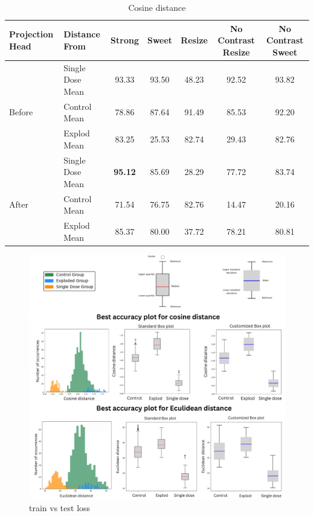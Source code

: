 \begin{table}[H]
  \centering
  \begin{tabular}{@{}llccccc@{}}
  \toprule
  Projection Head & Distance From      & Strong & Sweet & Resize & No Contrast Resize & No Contrast Sweet \\ \midrule
                  & Single Dose Mean   & 93.33      & 93.50     & 48.23      & 92.52                  & 93.82                 \\
  Before          & Control Mean       & 78.86      & 87.64     & 91.49      & 85.53                  & 92.20                 \\
                  & Explod Mean        & 83.25      & 25.53     & 82.74      & 29.43                  & 82.76                 \\ \midrule
                  & Single Dose Mean   & \textbf{95.12}      & 85.69     & 28.29      & 77.72                  & 83.74                 \\
  After           & Control Mean       & 71.54      & 76.75     & 82.76      & 14.47                  & 20.16                 \\
                  & Explod Mean        & 85.37      & 80.00     & 37.72      & 78.21                  & 80.81                 \\ \bottomrule
  \end{tabular}
  \caption{Cosine distance}
  \label{tab:table_label}
\end{table}

\begin{figure}[H]
  \centering
  \includegraphics[scale=0.5]{figures/allbox.pdf} 
  \caption{train vs test loss}
  \label{fig:unloss}
\end{figure}



